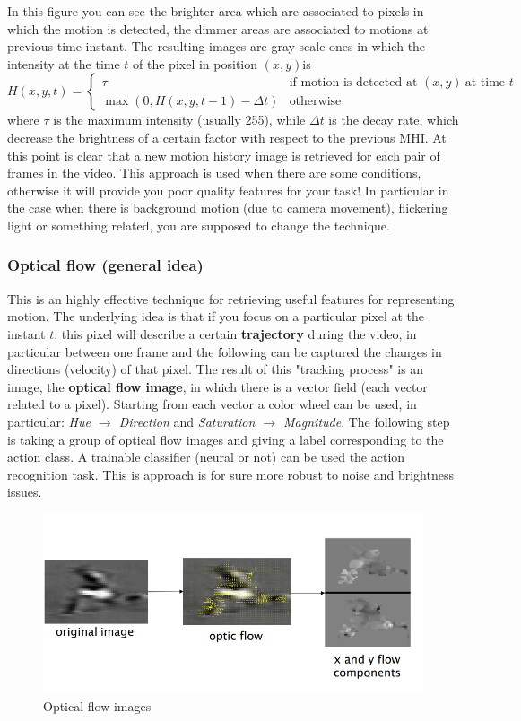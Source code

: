In this figure you can see the brighter area which are associated to pixels in which the motion is detected, the dimmer areas are associated to motions at previous time instant. The resulting images are gray scale ones in which the intensity at the time $t$ of the pixel in position $(x,y)$is  
\begin{equation*}
    H(x,y,t)=\begin{cases}
        \tau&\text{if motion is detected at } (x,y) \ \text{at time } t\\
        \max(0,H(x,y,t-1)-\Delta{t})&\text{otherwise}
    \end{cases}
\end{equation*}
where $\tau$ is the maximum intensity (usually 255), while $\Delta{t}$ is the decay rate, which decrease the brightness of a certain factor with respect to the previous MHI. At this point is clear that  a new motion history image is retrieved for each pair of frames in the video. This approach is used when there are some conditions, otherwise it will provide you poor quality features for your task! In particular in the case when there is background motion (due to camera movement), flickering light or something related, you are supposed to change the technique.

\subsubsection{Optical flow (general idea)}
This is an highly effective technique for retrieving useful features for representing motion. The underlying idea is that if you focus on a particular pixel at the instant $t$, this pixel will describe a certain \textbf{trajectory} during the video, in particular between one frame and the following can be captured the changes in directions (velocity) of that pixel. The result of this "tracking process" is an image, the \textbf{optical flow image}, in which there is a vector field (each vector related to a pixel). Starting from each vector a color wheel can be used, in particular: \textit{Hue $\to$ Direction} and \textit{Saturation $\to$ Magnitude}.  The following step is taking a group of optical flow images and giving a label corresponding to the action class. A trainable classifier (neural or not) can be used the action recognition task. This is approach is for sure more robust to noise and brightness issues.


\begin{figure}[h]
    \centering
    \includegraphics[scale=0.7]{img/optical.png}
    \caption{Optical flow images}
\end{figure}

